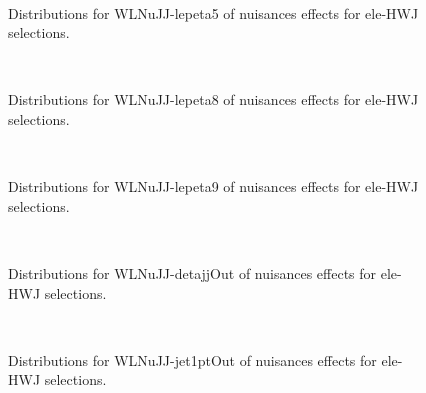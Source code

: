 \begin{figure}[htbp]  
\centering 
\\ 
\caption{ 
   Distributions for WLNuJJ-lepeta5 of nuisances effects for ele-HWJ selections.
} 
\label{fig:WLNuJJ_lepeta5_ele_HWJ} 
\end{figure} 




\begin{figure}[htbp]  
\centering 
\\ 
\caption{ 
   Distributions for WLNuJJ-lepeta8 of nuisances effects for ele-HWJ selections.
} 
\label{fig:WLNuJJ_lepeta8_ele_HWJ} 
\end{figure} 




\begin{figure}[htbp]  
\centering 
\\ 
\caption{ 
   Distributions for WLNuJJ-lepeta9 of nuisances effects for ele-HWJ selections.
} 
\label{fig:WLNuJJ_lepeta9_ele_HWJ} 
\end{figure} 




\begin{figure}[htbp]  
\centering 
\\ 
\caption{ 
   Distributions for WLNuJJ-detajjOut of nuisances effects for ele-HWJ selections.
} 
\label{fig:WLNuJJ_detajjOut_ele_HWJ} 
\end{figure} 




\begin{figure}[htbp]  
\centering 
\\ 
\caption{ 
   Distributions for WLNuJJ-jet1ptOut of nuisances effects for ele-HWJ selections.
} 
\label{fig:WLNuJJ_jet1ptOut_ele_HWJ} 
\end{figure} 


